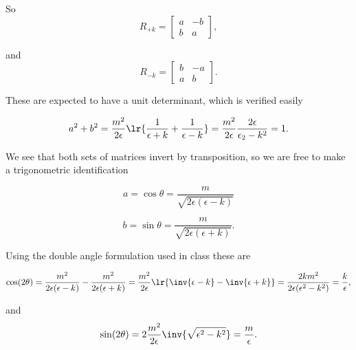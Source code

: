 So
\begin{dmath}\label{eqn:gradQuantumProblemSet4Problem3:380}
R_{+k}
=
\begin{bmatrix}
a & - b \\
b & a
\end{bmatrix},
\end{dmath}

and
\begin{dmath}\label{eqn:gradQuantumProblemSet4Problem3:400}
R_{-k}
=
\begin{bmatrix}
b & -a \\
a & b
\end{bmatrix}.
\end{dmath}

These are expected to have a unit determinant, which is verified easily

\begin{dmath}\label{eqn:gradQuantumProblemSet4Problem3:420}
a^2 + b^2
=
\frac{m^2}{2 \epsilon}
\lr{
\frac{1}{\epsilon + k}
+
\frac{1}{\epsilon - k}
}
=
\frac{m^2}{2 \epsilon}
\frac{2 \epsilon}{\epsilon_2 - k^2}
= 1.
\end{dmath}

We see that both sets of matrices invert by transposition, so we are free to make a trigonometric identification

\begin{equation}\label{eqn:gradQuantumProblemSet4Problem3:440}
a = \cos\theta
=
\frac{m}{\sqrt{2\epsilon(\epsilon - k)}}
\end{equation}

\begin{equation}\label{eqn:gradQuantumProblemSet4Problem3:460}
b = \sin\theta
=
\frac{m}{\sqrt{2\epsilon(\epsilon + k)}}.
\end{equation}

Using the double angle formulation used in class these are

\begin{dmath}\label{eqn:gradQuantumProblemSet4Problem3:480}
\cos(2 \theta)
=
\frac{m^2}{2\epsilon(\epsilon - k)} -
\frac{m^2}{2\epsilon(\epsilon + k)}
=
\frac{m^2}{2 \epsilon} \lr{ \inv{\epsilon - k} - \inv{\epsilon + k} }
=
\frac{2 k m^2}{2 \epsilon (\epsilon^2 - k^2)}
=
\frac{k}{\epsilon},
\end{dmath}

and
\begin{dmath}\label{eqn:gradQuantumProblemSet4Problem3:500}
\sin(2 \theta)
=
2 \frac{m^2}{2 \epsilon} \inv{\sqrt{\epsilon^2 - k^2}}
=
\frac{m}{\epsilon}.
\end{dmath}

